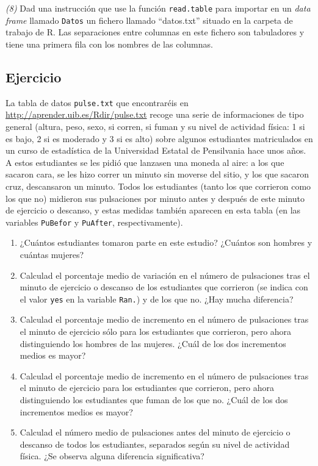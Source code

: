\documentclass[]{book}
\theoremstyle{definition}
\theoremstyle{definition}
\theoremstyle{definition}
\theoremstyle{remark}
\begin{document}
\emph{(8)} Dad una instrucción que use la función \texttt{read.table} para importar en un \emph{data frame} llamado \texttt{Datos} un fichero llamado ``datos.txt'' situado en la carpeta de trabajo de R. Las separaciones entre columnas en este fichero son tabuladores y tiene una primera fila con los nombres de las columnas.

\hypertarget{ejercicio-4}{%
\subsection*{Ejercicio}\label{ejercicio-4}}

La tabla de datos \texttt{pulse.txt} que encontraréis en \url{http://aprender.uib.es/Rdir/pulse.txt} recoge una serie de informaciones de tipo general (altura, peso, sexo, si corren, si fuman y su nivel de actividad física: 1 si es bajo, 2 si es moderado y 3 si es alto) sobre algunos estudiantes matriculados en un curso de estadística de la Universidad Estatal de Pensilvania hace unos años. A estos estudiantes se les pidió que lanzasen una moneda al aire: a los que sacaron cara, se les hizo correr un minuto sin moverse del sitio, y los que sacaron cruz, descansaron un minuto. Todos los estudiantes (tanto los que corrieron como los que no) midieron sus pulsaciones por minuto antes y después de este minuto de ejercicio o descanso, y estas medidas también aparecen en esta tabla (en las variables \texttt{PuBefor} y \texttt{PuAfter}, respectivamente).

\begin{enumerate}
\def\labelenumi{\alph{enumi}.}
\item
  ¿Cuántos estudiantes tomaron parte en este estudio? ¿Cuántos son hombres y cuántas mujeres?
\item
  Calculad el porcentaje medio de variación en el número de pulsaciones tras el minuto de ejercicio o descanso de los estudiantes que corrieron (se indica con el valor \texttt{yes} en la variable \texttt{Ran.}) y de los que no. ¿Hay mucha diferencia?
\item
  Calculad el porcentaje medio de incremento en el número de pulsaciones tras el minuto de ejercicio sólo para los estudiantes que corrieron, pero ahora distinguiendo los hombres de las mujeres. ¿Cuál de los dos incrementos medios es mayor?
\item
  Calculad el porcentaje medio de incremento en el número de pulsaciones tras el minuto de ejercicio para los estudiantes que corrieron, pero ahora distinguiendo los estudiantes que fuman de los que no. ¿Cuál de los dos incrementos medios es mayor?
\item
  Calculad el número medio de pulsaciones antes del minuto de ejercicio o descanso de todos los estudiantes, separados según su nivel de actividad física. ¿Se observa alguna diferencia significativa?
\end{enumerate}
\end{document}
